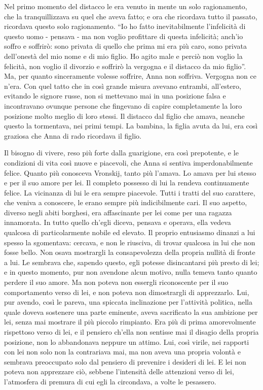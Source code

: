 Nel primo momento del distacco le era venuto in mente un solo ragionamento, che la tranquillizzava su quel che aveva fatto; e ora che ricordava tutto il passato, ricordava questo solo ragionamento. ``Io ho fatto inevitabilmente l'infelicità di questo uomo - pensava - ma non voglio profittare di questa infelicità; anch'io soffro e soffrirò: sono privata di quello che prima mi era più caro, sono privata dell'onestà del mio nome e di mio figlio. Ho agito male e perciò non voglio la felicità, non voglio il divorzio e soffrirò la vergogna e il distacco da mio figlio''. Ma, per quanto sinceramente volesse soffrire, Anna non soffriva. Vergogna non ce n'era. Con quel tatto che in così grande misura avevano entrambi, all'estero, evitando le signore russe, non si mettevano mai in una posizione falsa e incontravano ovunque persone che fingevano di capire completamente la loro posizione molto meglio di loro stessi. Il distacco dal figlio che amava, neanche questo la tormentava, nei primi tempi. La bambina, la figlia avuta da lui, era così graziosa che Anna di rado ricordava il figlio. 

Il bisogno di vivere, reso più forte dalla guarigione, era così prepotente, e le condizioni di vita così nuove e piacevoli, che Anna si sentiva imperdonabilmente felice. Quanto più conosceva Vronskij, tanto più l'amava. Lo amava per lui stesso e per il suo amore per lei. Il completo possesso di lui la rendeva continuamente felice. La vicinanza di lui le era sempre piacevole. Tutti i tratti del suo carattere, che veniva a conoscere, le erano sempre più indicibilmente cari. Il suo aspetto, diverso negli abiti borghesi, era affascinante per lei come per una ragazza innamorata. In tutto quello ch'egli diceva, pensava e operava, ella vedeva qualcosa di particolarmente nobile ed elevato. Il proprio entusiasmo dinanzi a lui spesso la sgomentava: cercava, e non le riusciva, di trovar qualcosa in lui che non fosse bello. Non osava mostrargli la consapevolezza della propria nullità di fronte a lui. Le sembrava che, sapendo questo, egli potesse disincantarsi più presto di lei; e in questo momento, pur non avendone alcun motivo, nulla temeva tanto quanto perdere il suo amore. Ma non poteva non essergli riconoscente per il suo comportamento verso di lei, e non poteva non dimostrargli di apprezzarlo. Lui, pur avendo, così le pareva, una spiccata inclinazione per l'attività politica, nella quale doveva sostenere una parte eminente, aveva sacrificato la sua ambizione per lei, senza mai mostrare il più piccolo rimpianto. Era più di prima amorevolmente rispettoso verso di lei, e il pensiero ch'ella non sentisse mai il disagio della propria posizione, non lo abbandonava neppure un attimo. Lui, così virile, nei rapporti con lei non solo non la contrariava mai, ma non aveva una propria volontà e sembrava preoccupato solo dal pensiero di prevenire i desideri di lei. E lei non poteva non apprezzare ciò, sebbene l'intensità delle attenzioni verso di lei, l'atmosfera di premura di cui egli la circondava, a volte le pesassero. 

